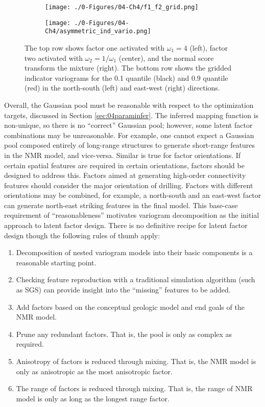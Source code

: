 \begin{figure}[!htb]
    \begin{subfigure}{1.0\textwidth}
        \centering
        \texttt{[image: ./0-Figures/04-Ch4/f1\_f2\_grid.png]}
    \end{subfigure}
    \begin{subfigure}{1.0\textwidth}
        \centering
        \texttt{[image: ./0-Figures/04-Ch4/asymmetric\_ind\_vario.png]}
    \end{subfigure}
    \caption{The top row shows factor one activated with $\omega_{1}=4$ (left), factor two activated with $\omega_{2}=1/\omega_{1}$ (center), and the normal score transform the mixture (right). The bottom row shows the gridded indicator variograms for the 0.1 quantile (black) and 0.9 quantile (red) in the north-south (left) and east-west (right) directions. }
    \label{fig:pool_asymmetry}
\end{figure}

Overall, the Gaussian pool must be reasonable with respect to the optimization targets, discussed in Section \ref{sec:04paraminfer}. The inferred mapping function is non-unique, so there is no ``correct'' Gaussian pool; however, some latent factor combinations may be unreasonable. For example, one cannot expect a Gaussian pool composed entirely of long-range structures to generate short-range features in the \gls{NMR} model, and vice-versa. Similar is true for factor orientations. If certain spatial features are required in certain orientations, factors should be designed to address this. Factors aimed at generating high-order connectivity features should consider the major orientation of drilling. Factors with different orientations may be combined, for example, a north-south and an east-west factor can generate north-east striking features in the final model. This base-case requirement of ``reasonableness'' motivates variogram decomposition as the initial approach to latent factor design. There is no definitive recipe for latent factor design though the following rules of thumb apply:
\begin{enumerate}[noitemsep]
    \item Decomposition of nested variogram models into their basic components   is a reasonable starting point.
    \item Checking feature reproduction with a traditional simulation algorithm (such as \gls{SGS}) can provide insight into the ``missing'' features to be added.
    \item Add factors based on the conceptual geologic model and end goals of the \gls{NMR} model.
    \item Prune any redundant factors. That is, the pool is only as complex as required.
    \item Anisotropy of factors is reduced through mixing. That is, the \gls{NMR} model is only as anisotropic as the most anisotropic factor.
    \item The range of factors is reduced through mixing. That is, the range of \gls{NMR} model is only as long as the longest range factor.
\end{enumerate}

